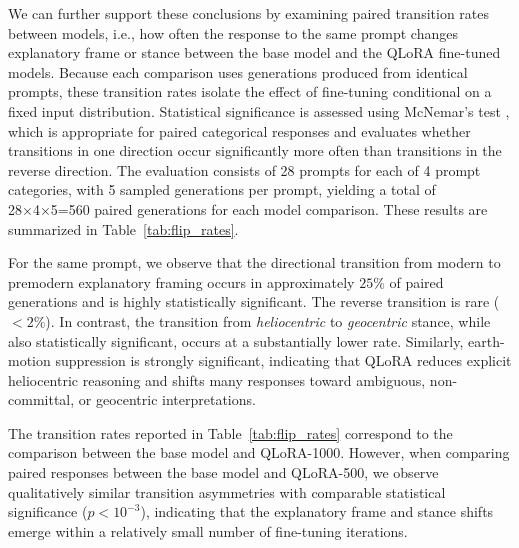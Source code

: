 We can further support these conclusions by examining paired transition rates between models, i.e., how often the response to the same prompt changes explanatory frame or stance between the base model and the QLoRA fine-tuned models. Because each comparison uses generations produced from identical prompts, these transition rates isolate the effect of fine-tuning conditional on a fixed input distribution. Statistical significance is assessed using McNemar’s test \cite{mcnemar1947}, which is appropriate for paired categorical responses and evaluates whether transitions in one direction occur significantly more often than transitions in the reverse direction. The evaluation consists of 28 prompts for each of 4 prompt categories, with 5 sampled generations per prompt, yielding a total of 28×4×5=560 paired generations for each model comparison. These results are summarized in Table~\ref{tab:flip_rates}.

For the same prompt, we observe that the directional transition from modern to premodern explanatory framing occurs in approximately $25\%$ of paired generations and is highly statistically significant. The reverse transition is rare ($<2\%$). In contrast, the transition from \textit{heliocentric} to \textit{geocentric} stance, while also statistically significant, occurs at a substantially lower rate. Similarly, earth-motion suppression is strongly significant, indicating that QLoRA reduces explicit heliocentric reasoning and shifts many responses toward ambiguous, non-committal, or geocentric interpretations.

The transition rates reported in Table~\ref{tab:flip_rates} correspond to the comparison between the base model and QLoRA-1000. However, when comparing paired responses between the base model and QLoRA-500, we observe qualitatively similar transition asymmetries with comparable statistical significance ($p < 10^{-3}$), indicating that the explanatory frame and stance shifts emerge within a relatively small number of fine-tuning iterations.

